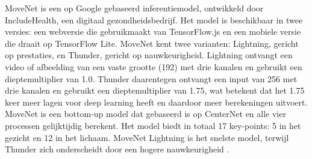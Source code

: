 MoveNet is een op Google gebaseerd inferentiemodel, ontwikkeld door IncludeHealth, een digitaal gezondheidsbedrijf.
Het model is beschikbaar in twee versies: een webversie die gebruikmaakt van TensorFlow.js en een mobiele versie die draait op TensorFlow Lite. 
MoveNet kent twee varianten: Lightning, gericht op prestaties, en Thunder, gericht op nauwkeurigheid. 
Lightning ontvangt een video of afbeelding van een vaste grootte (192) met drie kanalen en gebruikt een dieptemultiplier van 1.0. 
Thunder daarentegen ontvangt een input van 256 met drie kanalen en gebruikt een dieptemultiplier van 1.75, wat betekent dat het 1.75 keer meer lagen voor deep learning heeft en daardoor meer berekeningen uitvoert.
MoveNet is een bottom-up model dat gebaseerd is op CenterNet en alle vier processen gelijktijdig berekent. 
Het model biedt in totaal 17 key-points: 5 in het gezicht en 12 in het lichaam. 
MoveNet Lightning is het snelste model, terwijl Thunder zich onderscheidt door een hogere nauwkeurigheid \autocite{BeomjunEtAl2022}. 

